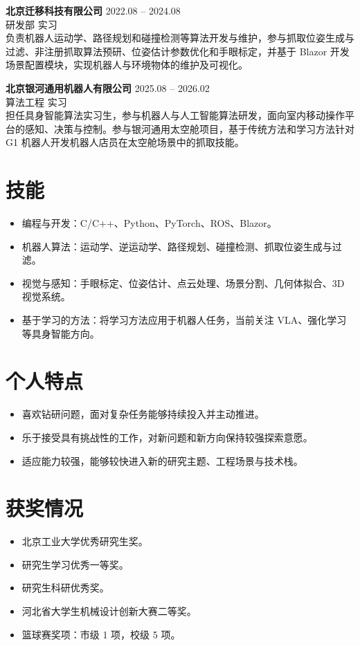 \documentclass[11pt,a4paper]{article}
\newcommand{\entry}[4]{%
  \textbf{#1} \hfill #2\\
  {\color{textgray}#3} \hfill {#4}\\[-2pt]
}
\begin{document}
\entry{北京迁移科技有限公司}{2022.08 -- 2024.08}{研发部}{实习}
负责机器人运动学、路径规划和碰撞检测等算法开发与维护，参与抓取位姿生成与过滤、非注册抓取算法预研、位姿估计参数优化和手眼标定，并基于 Blazor 开发场景配置模块，实现机器人与环境物体的维护及可视化。

\entry{北京银河通用机器人有限公司}{2025.08 -- 2026.02}{算法工程}{实习}
担任具身智能算法实习生，参与机器人与人工智能算法研发，面向室内移动操作平台的感知、决策与控制。参与银河通用太空舱项目，基于传统方法和学习方法针对 G1 机器人开发机器人店员在太空舱场景中的抓取技能。

\section*{技能}
\begin{itemize}
	\item 编程与开发：C/C++、Python、PyTorch、ROS、Blazor。
	\item 机器人算法：运动学、逆运动学、路径规划、碰撞检测、抓取位姿生成与过滤。
	\item 视觉与感知：手眼标定、位姿估计、点云处理、场景分割、几何体拟合、3D 视觉系统。
	\item 基于学习的方法：将学习方法应用于机器人任务，当前关注 VLA、强化学习等具身智能方向。
\end{itemize}

\section*{个人特点}
\begin{itemize}
	\item 喜欢钻研问题，面对复杂任务能够持续投入并主动推进。
	\item 乐于接受具有挑战性的工作，对新问题和新方向保持较强探索意愿。
	\item 适应能力较强，能够较快进入新的研究主题、工程场景与技术栈。
\end{itemize}

\section*{获奖情况}
\begin{itemize}
	\item 北京工业大学优秀研究生奖。
	\item 研究生学习优秀一等奖。
	\item 研究生科研优秀奖。
	\item 河北省大学生机械设计创新大赛二等奖。
	\item 篮球赛奖项：市级 1 项，校级 5 项。
\end{itemize}
\end{document}
